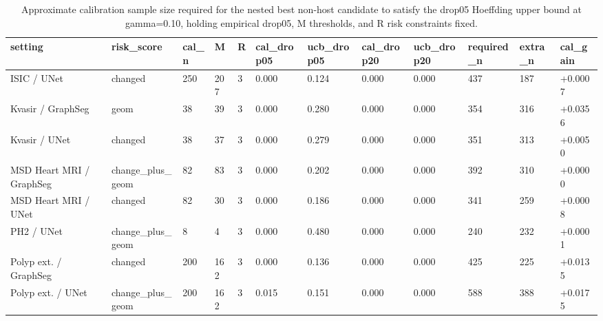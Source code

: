\begin{table}[t]
\centering
\small
\caption{Approximate calibration sample size required for the nested best non-host candidate to satisfy the drop05 Hoeffding upper bound at gamma=0.10, holding empirical drop05, M thresholds, and R risk constraints fixed.}
\label{tab:nested_sample_size_requirement}
\begin{tabular}{llllllllllll}
\toprule
setting & risk\_score & cal\_n & M & R & cal\_drop05 & ucb\_drop05 & cal\_drop20 & ucb\_drop20 & required\_n & extra\_n & cal\_gain \\
\midrule
ISIC / UNet & changed & 250 & 207 & 3 & 0.000 & 0.124 & 0.000 & 0.000 & 437 & 187 & +0.0007 \\
Kvasir / GraphSeg & geom & 38 & 39 & 3 & 0.000 & 0.280 & 0.000 & 0.000 & 354 & 316 & +0.0356 \\
Kvasir / UNet & changed & 38 & 37 & 3 & 0.000 & 0.279 & 0.000 & 0.000 & 351 & 313 & +0.0050 \\
MSD Heart MRI / GraphSeg & change\_plus\_geom & 82 & 83 & 3 & 0.000 & 0.202 & 0.000 & 0.000 & 392 & 310 & +0.0000 \\
MSD Heart MRI / UNet & changed & 82 & 30 & 3 & 0.000 & 0.186 & 0.000 & 0.000 & 341 & 259 & +0.0008 \\
PH2 / UNet & change\_plus\_geom & 8 & 4 & 3 & 0.000 & 0.480 & 0.000 & 0.000 & 240 & 232 & +0.0001 \\
Polyp ext. / GraphSeg & changed & 200 & 162 & 3 & 0.000 & 0.136 & 0.000 & 0.000 & 425 & 225 & +0.0135 \\
Polyp ext. / UNet & change\_plus\_geom & 200 & 162 & 3 & 0.015 & 0.151 & 0.000 & 0.000 & 588 & 388 & +0.0175 \\
\bottomrule
\end{tabular}
\end{table}

